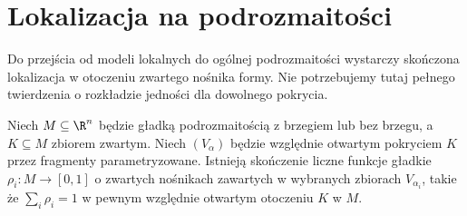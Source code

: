 \section{Lokalizacja na podrozmaitości}

Do przejścia od modeli lokalnych do ogólnej
podrozmaitości wystarczy skończona lokalizacja
w otoczeniu zwartego nośnika formy.
Nie potrzebujemy tutaj pełnego twierdzenia
o rozkładzie jedności dla dowolnego pokrycia.

\begin{lemat}
\label{ma2:lem:stokes-localization}
Niech $M\subseteq\R^n$ będzie gładką
podrozmaitością z brzegiem lub bez brzegu,
a $K\subseteq M$ zbiorem zwartym.
Niech $(V_\alpha)$ będzie względnie otwartym
pokryciem $K$ przez fragmenty parametryzowane.
Istnieją skończenie liczne funkcje gładkie
$\rho_i:M\to[0,1]$ o zwartych nośnikach
zawartych w wybranych zbiorach $V_{\alpha_i}$,
takie że $\sum_i\rho_i=1$ w pewnym względnie
otwartym otoczeniu $K$ w $M$.
\end{lemat}
